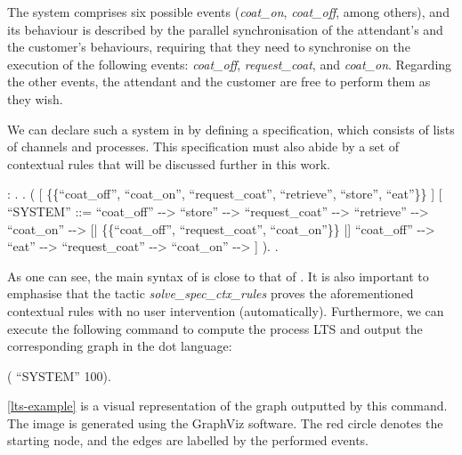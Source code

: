 The system comprises six possible events (\emph{coat\_on}, \emph{coat\_off}, among others), and its behaviour is described by the parallel synchronisation of the attendant's and the customer's behaviours, requiring that they need to synchronise on the execution of the following events: \emph{coat\_off}, \emph{request\_coat}, and \emph{coat\_on}. Regarding the other events, the attendant and the customer are free to perform them as they wish.

We can declare such a system in \CSPcoq{} by defining a specification, which consists of lists of channels and processes. This specification must also abide by a set of contextual rules that will be discussed further in this work.

\begin{coqdoccode}
	\coqdocnoindent
	  : .\coqdoceol
	\coqdocnoindent
	.\coqdoceol
	\coqdocindent{1.00em}
	 (\coqdoceol
	\coqdocindent{2.00em}
	\coqdoceol
	\coqdocindent{2.00em}
	[  \{\{``coat\_off'', ``coat\_on'', ``request\_coat'', ``retrieve'', ``store'', ``eat''\}\} ]\coqdoceol
	\coqdocindent{2.00em}
	[ ``SYSTEM'' ::=\coqdoceol
	\coqdocindent{3.00em}
	``coat\_off'' -{}-> ``store'' -{}-> ``request\_coat'' -{}-> ``retrieve'' -{}-> ``coat\_on'' -{}-> \coqdoceol
	\coqdocindent{3.00em}
	[| \{\{``coat\_off'', ``request\_coat'', ``coat\_on''\}\} |]\coqdoceol
	\coqdocindent{3.00em}
	``coat\_off'' -{}-> ``eat'' -{}-> ``request\_coat'' -{}-> ``coat\_on'' -{}->  ]\coqdoceol
	\coqdocindent{1.00em}
	).\coqdoceol
	\coqdocnoindent
	.\coqdoceol
\end{coqdoccode}

As one can see, the main syntax of \CSPcoq{} is close to that of \CSPM{}. It is also important to emphasise that the tactic \emph{solve\_spec\_ctx\_rules} proves the aforementioned contextual rules with no user intervention (automatically). Furthermore, we can execute the following command to compute the process LTS and output the corresponding graph in the dot language:

\begin{coqdoccode}
	\coqdocnoindent
	  (  ``SYSTEM'' 100).\coqdoceol
\end{coqdoccode}

\autoref{lts-example} is a visual representation of the graph outputted by this command. The image is generated using the GraphViz software. The red circle denotes the starting node, and the edges are labelled by the performed events.

